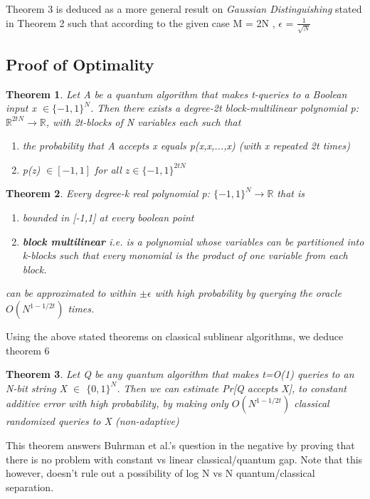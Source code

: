 \documentclass{article}
\newtheorem{theorem}{Theorem}
\begin{document}
Theorem 3 is deduced as a more general result on \textit{Gaussian Distinguishing} stated in Theorem 2 such that according to the given case M = 2N , $\epsilon$ = $\frac{1}{\sqrt{N}}$
\newpage
\subsection{Proof of Optimality}

\begin{theorem}
Let A be a quantum algorithm that makes t-queries to a Boolean input x $\in\{-1,1\}^{N}$. Then there exists a degree-2t block-multilinear polynomial p: $\mathbb{R}^{2tN} \rightarrow \mathbb{R}$, with 2t-blocks of N variables each such that 
\begin{enumerate}
\item the probability that A accepts x equals p(x,x,...,x) (with x repeated 2t times)
\item p(z) $\in [-1,1]$ for all $z \in \{-1,1\}^{2tN}$
\end{enumerate}
\end{theorem}

\begin{theorem}
Every degree-k real polynomial p: $\{-1,1\}^{N} \rightarrow \mathbb{R}$ that is 
\begin{enumerate}
\item bounded in [-1,1] at every boolean point
\item \textbf{block multilinear} i.e. is a polynomial whose variables can be partitioned into k-blocks such that every monomial is the product of one variable from each block. 
\end{enumerate}
can be approximated to within $\pm \epsilon$ with high probability by querying the oracle $O\left(N^{1-1 / 2 t}\right)$ times.
\end{theorem}

Using the above stated theorems on classical sublinear algorithms, we deduce theorem 6
\begin{theorem}
Let Q be any quantum algorithm that makes t=O(1) queries to an N-bit string X $\in$ $\{0,1\}^{N}$. Then we can estimate Pr[Q accepts X], to constant additive error with high probability, by making only $O\left(N^{1-1 / 2 t}\right)$ classical randomized queries to X (non-adaptive)
\end{theorem}

This theorem answers Buhrman et al.'s question in the negative by proving that there is no problem with constant vs linear classical/quantum gap. Note that this however, doesn't rule out a possibility of log N vs N quantum/classical separation. 
\end{document}
